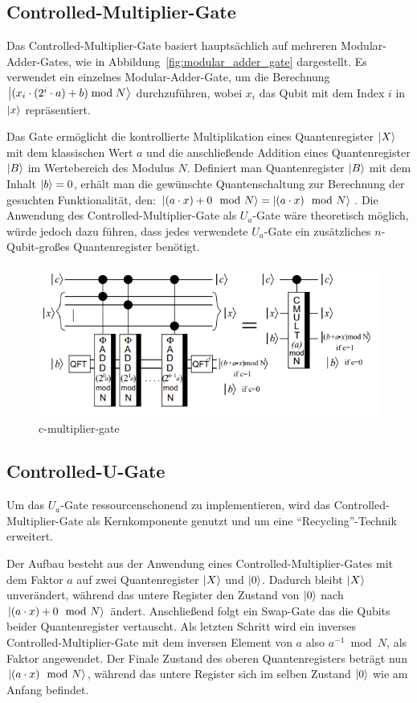 \documentclass[a4paper,journal]{IEEEtran}
\begin{document}
\subsection{Controlled-Multiplier-Gate}
Das Controlled-Multiplier-Gate basiert hauptsächlich auf mehreren Modular-Adder-Gates,
wie in Abbildung~\ref{fig:modular_adder_gate} dargestellt.
Es verwendet ein einzelnes Modular-Adder-Gate,
um die Berechnung \(\ket{(x_i\cdot(2^i \cdot a)+b) \bmod N}\) durchzuführen,
wobei \(x_i\) das Qubit mit dem Index \(i\) in \(\ket{x}\) repräsentiert.

Das Gate ermöglicht die kontrollierte Multiplikation
eines Quantenregister \(\ket{X}\) mit dem klassischen Wert \(a\) und
die anschließende Addition eines Quantenregister \(\ket{B}\) im Wertebereich des Modulus \(N\).
Definiert man Quantenregister \(\ket{B}\) mit dem Inhalt \(\ket{b} = 0\),
erhält man die gewünschte Quantenschaltung zur Berechnung der gesuchten Funktionalität, den:
\(\ket{(a \cdot x) + 0\mod N} = \ket{(a \cdot x)\mod N}\).
Die Anwendung des Controlled-Multiplier-Gate als \(U_a\)-Gate wäre theoretisch möglich,
würde jedoch dazu führen, dass jedes verwendete \(U_a\)-Gate ein
zusätzliches \(n\)-Qubit-großes Quantenregister benötigt.
\begin{figure}[!h]
\caption{c-multiplier-gate~\cite{beauregard2003circuit}}
\label{fig:c-multiplier-gate}
\includegraphics[width=\linewidth]{c-multiplier-gate.PNG}
\centering
\end{figure}

\subsection{Controlled-U-Gate}
Um das \(U_a\)-Gate ressourcenschonend zu implementieren,
wird das Controlled-Multiplier-Gate als Kernkomponente genutzt und um eine "`Recycling"'-Technik erweitert.

Der Aufbau besteht aus der Anwendung eines Controlled-Multiplier-Gates
mit dem Faktor \(a\) auf zwei Quantenregister \(\ket{X}\) und \(\ket{0}\).
Dadurch bleibt \(\ket{X}\) unverändert,
während das untere Register den Zustand von \(\ket{0}\) nach \(\ket{(a \cdot x) + 0\mod N}\) ändert.
Anschließend folgt ein Swap-Gate das die Qubits beider Quantenregister vertauscht.
Als letzten Schritt wird ein inverses Controlled-Multiplier-Gate
mit dem inversen Element von \(a\) also \(a^{-1} \bmod N\),
als Faktor angewendet.
Der Finale Zustand des oberen Quantenregisters beträgt nun \(\ket{(a \cdot x) \mod N}\),
während das untere Register sich im selben Zustand \(\ket{0}\) wie am Anfang befindet.
\end{document}
